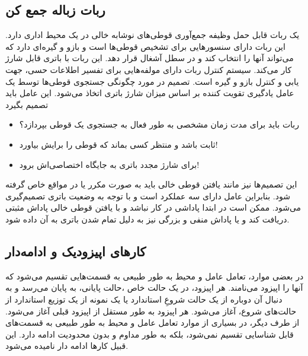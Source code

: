 \subsection{ربات زباله جمع کن}
یک ربات قابل حمل وظیفه جمع‌آوری قوطی‌های نوشابه خالی در 
یک محیط اداری دارد. این ربات دارای سنسورهایی برای تشخیص قوطی‌ها است و بازو و گیره‌ای دارد که می‌تواند آنها را انتخاب کند و در سطل آشغال قرار دهد. این ربات  با باتری قابل شارژ کار می‌کند. سیستم کنترل ربات
دارای مولفه‌هایی برای تفسیر اطلاعات حسی، جهت یابی و کنترل بازو و گیره است. تصمیم در مورد چگونگی جستجوی قوطی‌ها توسط یک عامل یادگیری تقویت کننده بر اساس میزان شارژ باتری اتخاذ می‌شود. این عامل باید تصمیم بگیرد  
\begin{itemize}
\item  ربات باید برای مدت زمان مشخصی به طور فعال به جستجوی  یک قوطی بپردازد؟
\item ثابت باشد و منتظر کسی بماند که قوطی را برایش بیاورد!
\item  برای شارژ مجدد باتری به جایگاه اختصاصی‌اش  برود!
\end{itemize}
این تصمیم‌ها نیز مانند یافتن قوطی خالی باید به صورت مکرر یا در مواقع خاص گرفته شود. بنابراین عامل
دارای سه عملکرد است و با توجه به وضعیت باتری تصمیم‌گیری می‌شود. ممکن است در ابتدا پاداشی در کار نباشد و با یافتن قوطی خالی پاداش مثبتی دریافت کند و یا پاداش منفی و بزرگی نیز به دلیل تمام شدن باتری به آن داده شود.


\subsection{کارهای اپیزودیک و ادامه‌دار}
در بعضی موارد، تعامل عامل و محیط به طور طبیعی به قسمت‌هایی تقسیم می‌شود که آنها را اپیزود می‌نامند. هر اپیزود، در یک حالت خاص ،حالت پایانی، به پایان می‌رسد و به دنبال آن دوباره از یک حالت شروعِ استاندارد یا یک نمونه از یک توزیع استاندارد از حالت‌های شروع، آغاز می‌شود. هر اپیزود به طور مستقل از اپیزود قبلی آغاز می‌شود.
از طرف دیگر، در بسیاری از موارد تعامل عامل و محیط به طور طبیعی به قسمت‌های قابل شناسایی تقسیم نمی‌شود، بلکه به طور مداوم و بدون محدودیت ادامه دارد. این قبیل کارها ادامه دار نامیده می‌شود.


